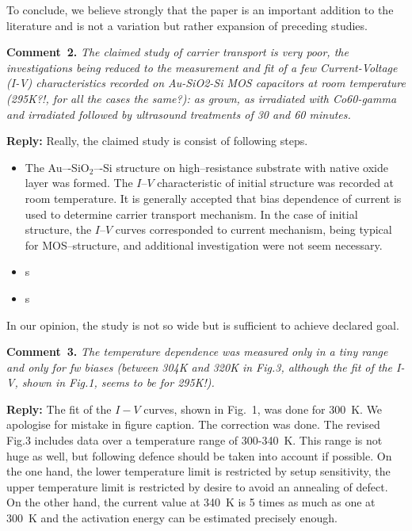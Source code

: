 \documentclass[aip,jap,preprint]{revtex4-1}
\begin{document}
To conclude, we believe strongly  that the paper is an important addition to the literature and is
not a variation but rather expansion of preceding studies.


\noindent
\textcolor[rgb]{0.00,0.50,1.00}{\textbf{Comment~2.}}
\emph{The claimed study of carrier transport is very poor, the investigations being reduced to the measurement and fit of a few Current-Voltage (I-V) characteristics recorded on Au-SiO2-Si MOS capacitors at room temperature (295K?!, for all the cases the same?): as grown, as irradiated with Co60-gamma and irradiated followed by ultrasound treatments of 30 and 60 minutes.}

\noindent
\textcolor[rgb]{0.51,0.00,0.00}{\textbf{Reply:}}
Really, the claimed study is consist of following steps.
\begin{itemize}
  \item The Au–-SiO$_2$–-Si structure on high--resistance substrate with native oxide layer was formed. 
      The $I$--$V$ characteristic of initial structure was recorded at room temperature.
      It is generally accepted that bias dependence of current is used to determine carrier transport mechanism.
      In the case of initial structure, the $I$--$V$ curves corresponded to current mechanism, being typical for MOS--structure, and additional investigation were not seem necessary.
  \item s
  \item s
\end{itemize}

In our opinion, the study is not so wide but is sufficient to achieve declared goal. 

\noindent
\textcolor[rgb]{0.00,0.50,1.00}{\textbf{Comment~3.}}
\emph{The temperature dependence was measured only in a tiny range and only for fw biases (between 304K and 320K in Fig.3, although the fit of the I-V, shown in Fig.1, seems to be for 295K!).}


\noindent
\textcolor[rgb]{0.51,0.00,0.00}{\textbf{Reply:}}
The fit of the $I-V$ curves, shown in Fig.~1, was done for 300~K.
We apologise for mistake in figure caption.
The correction was done.
The revised Fig.3 includes data over a temperature range of 300-340~K.
This range is not huge as well, but following defence should be taken into account if possible.
On the one hand, the lower temperature limit is restricted by setup sensitivity,
the upper temperature limit is restricted by desire to avoid an annealing of defect.
On the other hand, the current value at 340~K is 5 times as much as one at 300~K
and the activation energy can be estimated precisely enough.
\end{document}
